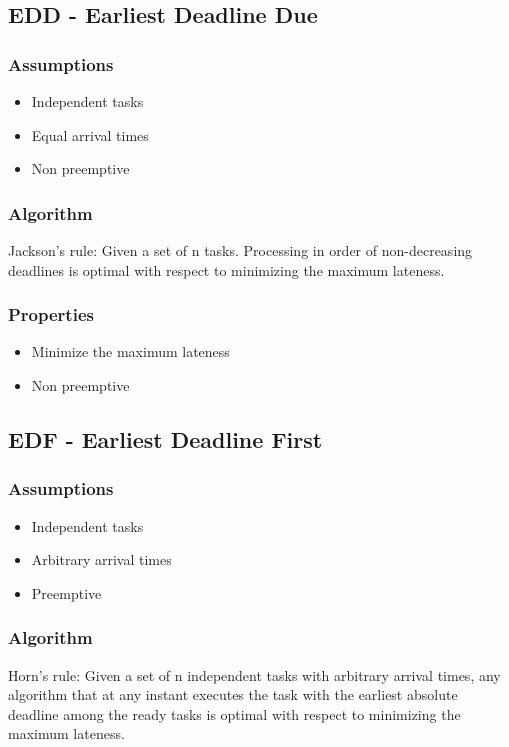 \subsection{EDD - Earliest Deadline Due}
\subsubsection{Assumptions}
\begin{itemize}[noitemsep]
\item Independent tasks
\item Equal arrival times
\item Non preemptive
\end{itemize}

\subsubsection{Algorithm}
Jackson’s rule: Given a set of n tasks. Processing in 
order of non-decreasing deadlines is optimal with respect 
to minimizing the maximum lateness.

\subsubsection{Properties}
\begin{itemize}[noitemsep]
\item Minimize the maximum lateness
\item Non preemptive
\end{itemize}



\subsection{EDF - Earliest Deadline First}
\subsubsection{Assumptions}
\begin{itemize}[noitemsep]
\item Independent tasks
\item Arbitrary arrival times
\item Preemptive
\end{itemize}

\subsubsection{Algorithm}
Horn’s rule: Given a set of n independent tasks with 
arbitrary arrival times, any algorithm that at any instant 
executes the task with the earliest absolute deadline 
among the ready tasks is optimal with respect to 
minimizing the maximum lateness.

